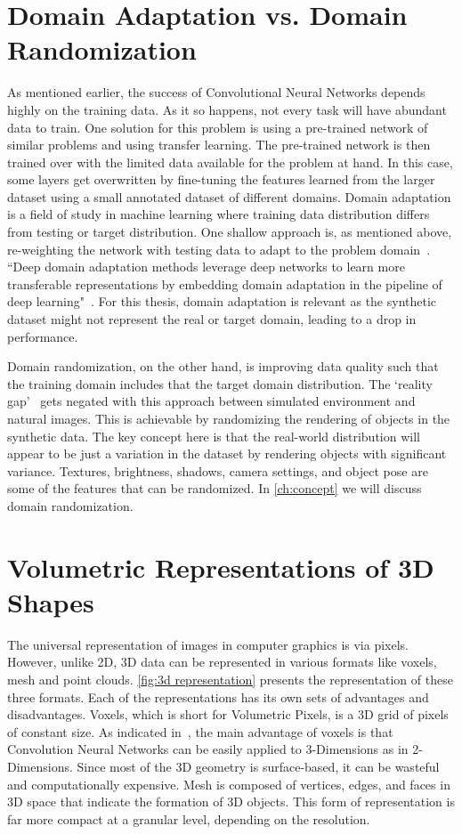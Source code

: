 \section{Domain Adaptation vs. Domain Randomization} \label{sec:da vs dr}

As mentioned earlier, the success of Convolutional Neural Networks depends highly on the training data.
As it so happens, not every task will have abundant data to train.
One solution for this problem is using a pre-trained network of similar problems and using transfer learning.
The pre-trained network is then trained over with the limited data available for the problem at hand.
In this case, some layers get overwritten by fine-tuning the features learned from the larger dataset using a small annotated dataset of different domains.
Domain adaptation is a field of study in machine learning where training data distribution differs from testing or target distribution.
One shallow approach is, as mentioned above,
re-weighting the network with testing data to adapt to the problem domain~\cite{Li2017PredictionRF}.
``Deep domain adaptation methods leverage deep networks to learn more transferable representations by embedding domain adaptation in the pipeline of
deep learning"~\cite{Wang2018}.
For this thesis, domain adaptation is relevant as the synthetic dataset might not represent the real or target domain, leading to a drop in performance.

Domain randomization, on the other hand, is improving data quality such that the training domain includes that the target domain distribution.
The `reality gap'~\cite{tobin2017domain} gets negated with this approach between simulated environment and natural images.
This is achievable by randomizing the rendering of objects in the synthetic data.
The key concept here is that the real-world distribution will appear to be just a variation in the dataset by rendering objects with significant variance.
Textures, brightness, shadows, camera settings, and object pose are some of the features that can be randomized.
In \autoref{ch:concept} we will discuss domain randomization.


\section{Volumetric Representations of 3D Shapes} \label{sec:Volumetric representation}
The universal representation of images in computer graphics is via pixels.
However, unlike 2D, 3D data can be represented in various formats like voxels, mesh and point clouds.
\autoref{fig:3d representation} presents the representation of these three formats.
Each of the representations has its own sets of advantages and disadvantages.
Voxels, which is short for Volumetric Pixels, is a 3D grid of pixels of constant size.
As indicated in~\cite{li2016fpnn}, the main advantage of voxels is that Convolution Neural Networks can be easily applied to 3-Dimensions as in 2-Dimensions.
Since most of the 3D geometry is surface-based, it can be wasteful and computationally expensive.
Mesh is composed of vertices, edges, and faces in 3D space that indicate the formation of 3D objects.
This form of representation is far more compact at a granular level, depending on the resolution.

